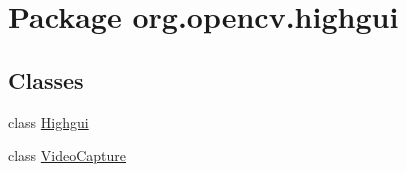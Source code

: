 \hypertarget{namespaceorg_1_1opencv_1_1highgui}{}\section{Package org.\+opencv.\+highgui}
\label{namespaceorg_1_1opencv_1_1highgui}
\subsection*{Classes}
\begin{DoxyCompactItemize}
\item 
class \mbox{\hyperlink{classorg_1_1opencv_1_1highgui_1_1_highgui}{Highgui}}
\item 
class \mbox{\hyperlink{classorg_1_1opencv_1_1highgui_1_1_video_capture}{Video\+Capture}}
\end{DoxyCompactItemize}
